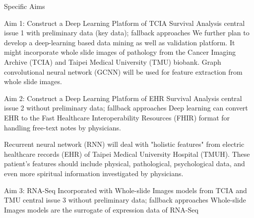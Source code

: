 \documentclass[12pt, a4paper]{article}
\begin{document}
Specific Aims %

Aim 1: Construct a Deep Learning Platform of TCIA Survival Analysis
central issue 1 with preliminary data (key data); fallback approaches %
We further plan to develop a deep-learning based data mining as well as validation platform. It might incorporate whole slide images of pathology from the Cancer Imaging Archive (TCIA) and Taipei Medical University (TMU) biobank.
Graph convolutional neural network (GCNN) will be used for feature extraction from whole slide images.



Aim 2: Construct a Deep Learning Platform of EHR Survival Analysis
central issue 2 without preliminary data; fallback approaches %
Deep learning can convert EHR to the Fast Healthcare Interoperability Resources (FHIR) format\citep{Rajkomar2018}\citep{HealthLevelSeven2019} for handling free-text notes by physicians.

Recurrent neural network (RNN) will deal with "holistic features" from electric healthcare records (EHR) of Taipei Medical University Hospital (TMUH).
These patient's features should include physical, pathological, psychological data, and even more spiritual information investigated by physicians.


Aim 3: RNA-Seq Incorporated with Whole-slide Images models from TCIA and TMU
central issue 3 without preliminary data; fallback approaches
Whole-slide Images models are the surrogate of expression data of RNA-Seq
\end{document}
